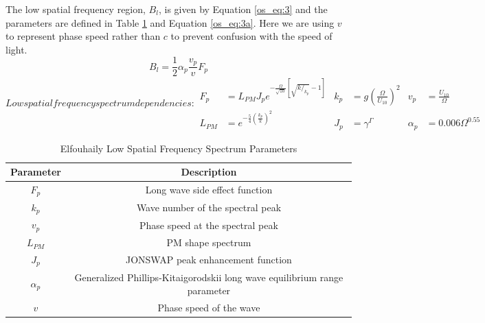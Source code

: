 The low spatial frequency region, $B_l$, is given by Equation \ref{os_eq:3} and the parameters are defined in Table \ref{os_tab:1} and Equation \ref{os_eq:3a}. Here we are using $v$ to represent phase speed rather than $c$ to prevent confusion with the speed of light.
\begin{equation}
  \label{os_eq:3}
 B_l = \frac{1}{2} \alpha_p \frac{v_p}{v} F_p
\end{equation}
\renewcommand{\baselinestretch}{2} \small\normalsize
\begin{subequations}
\label{os_eq:3a}
   Low spatial frequency spectrum dependencies:
\begin{align}
  F_p &= L_{PM}J_pe^{-\frac{\Omega}{\sqrt{10}}\left[\sqrt{k/_{k_p}} - 1 \right]} &  k_p &= g\left(\frac{\Omega}{U_{10}}\right)^2 & v_p &= \frac{U_{10}}{\Omega} \\
   L_{PM} &=e^{-\frac{5}{4}\left(\frac{k_p}{k} \right)^2} &  J_p &= \gamma^\Gamma  & \alpha_p &= 0.006\Omega^{0.55} 
\end{align}
\end{subequations}
\renewcommand{\baselinestretch}{2} \small\normalsize
\begin{table}[H]
  \begin{center}
      \renewcommand{\baselinestretch}{1} \small\normalsize
  \begin{quote}
    \caption[Elfouhaily Low Spatial Frequency Spectrum Parameters]{Elfouhaily Low Spatial Frequency Spectrum Parameters\label{os_tab:1}}
  \end{quote}
  \begin{tabular} {|c | c |}
    \hline
  \bf{Parameter} & \bf{Description} \\ \hline
  $F_p$ & Long wave side effect function \\ \hline
  $k_p$ &  Wave number of the spectral peak \\ \hline
  $v_p$ &  Phase speed at the spectral peak \\ \hline
  $L_{PM}$ & PM shape spectrum \\ \hline
  $J_p$ & JONSWAP peak enhancement function \\ \hline
  $\alpha_p$ & Generalized Phillips-Kitaigorodskii long wave equilibrium range parameter\\ \hline
  $v$ & Phase speed of the wave \\ \hline
\end{tabular}
\end{center}
\end{table}
\renewcommand{\baselinestretch}{2} \small\normalsize
